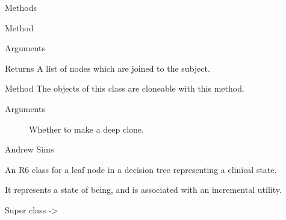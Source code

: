\documentclass[a4paper]{book}
\begin{document}
\begin{Section}{Methods}
\begin{SubSection}{Method }
\begin{SubSubSection}{Arguments}
\begin{description}
\end{description}


\end{SubSubSection}

%
\begin{SubSubSection}{Returns}
A list of nodes which are joined to the subject.
\end{SubSubSection}

\end{SubSection}



\hypertarget{method-clone}{}
%
\begin{SubSection}{Method }
The objects of this class are cloneable with this method.
%


%
\begin{SubSubSection}{Arguments}

\begin{description}

\item[] Whether to make a deep clone.

\end{description}


\end{SubSubSection}

\end{SubSection}

\end{Section}
%
\begin{Author}\relax
Andrew Sims 
\end{Author}
%
\begin{Description}\relax
An R6 class for a leaf node in a decision tree representing a clinical state.
\end{Description}
%
\begin{Details}\relax
It represents a state of being, and is associated with an incremental
utility.
\end{Details}
%
\begin{Section}{Super class}
 -> 
\end{Section}
%
\end{document}
